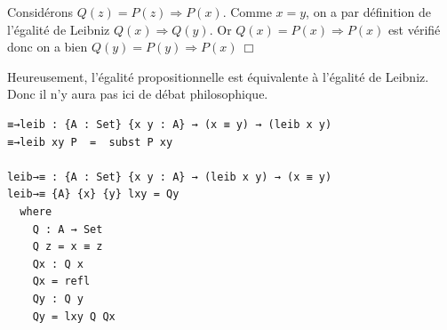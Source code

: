 \begin{enumerate}
Considérons $Q(z) = P(z) \Rightarrow P(x)$. Comme $x=y$, on a par définition de l'égalité de Leibniz $Q(x) \Rightarrow Q(y)$.
Or $Q(x) = P(x) \Rightarrow P(x)$ est vérifié donc on a bien $Q(y) = P(y) \Rightarrow P(x) \ \Box $ 

\vspace*{1cm}
Heureusement, l'égalité propositionnelle est équivalente à l'égalité de Leibniz. Donc il n'y aura pas ici de débat philosophique.
\begin{verbatim}
≡→leib : {A : Set} {x y : A} → (x ≡ y) → (leib x y)
≡→leib xy P  =  subst P xy

leib→≡ : {A : Set} {x y : A} → (leib x y) → (x ≡ y)
leib→≡ {A} {x} {y} lxy = Qy
  where
    Q : A → Set
    Q z = x ≡ z
    Qx : Q x
    Qx = refl
    Qy : Q y
    Qy = lxy Q Qx
\end{verbatim}
\end{enumerate}